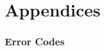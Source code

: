 \documentclass{article}
\begin{document}

%
%
\part{Appendices}

\appendix

\section{Error Codes}
\label{sec:error-codes}


\end{document}
